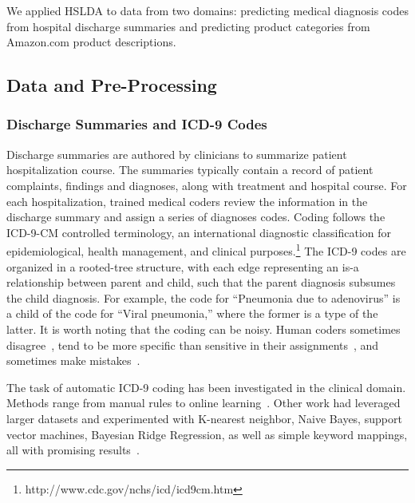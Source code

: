 We applied HSLDA to data from two domains: predicting medical
diagnosis codes from hospital discharge summaries and predicting product
categories from Amazon.com product descriptions.


\subsection{Data and Pre-Processing}

\subsubsection{Discharge Summaries and ICD-9 Codes}

Discharge summaries are authored by clinicians to summarize patient
hospitalization course. The summaries typically contain a record of patient
complaints, findings and diagnoses, along with treatment and hospital course.
For each hospitalization, trained medical coders review the information in the
discharge summary and assign a series of diagnoses codes. Coding follows the
ICD-9-CM controlled terminology, an international diagnostic classification for
epidemiological, health management, and clinical
purposes.\footnote{http://www.cdc.gov/nchs/icd/icd9cm.htm}  The ICD-9 codes are organized in a rooted-tree structure, with each
edge representing an is-a relationship between parent and child, such that the
parent diagnosis subsumes the child diagnosis. For example, the code for
{}``Pneumonia due to adenovirus'' is a child of the code for {}``Viral
pneumonia,'' where the former is a type of the latter.  It is worth noting that
the coding can be noisy. Human coders sometimes disagree~\cite{Challenge07},
tend to be more specific than sensitive in their
assignments~\cite{Birmetal2005}, and sometimes make
mistakes~\cite{FarzandipourEtAl10}.

The task of automatic ICD-9 coding has been investigated in the clinical
domain.  Methods range from manual
rules to online learning~\cite{Crammer2007,Goldstein2007,Farkas2008}.
Other work had leveraged larger datasets and experimented with K-nearest
neighbor, Naive Bayes, support vector machines, Bayesian Ridge Regression, as
well as simple keyword mappings, all with promising
results~\cite{LarkeyCroft95,RibeiroNeto2001,PakhomovEtAl06,Lita2008}.%

